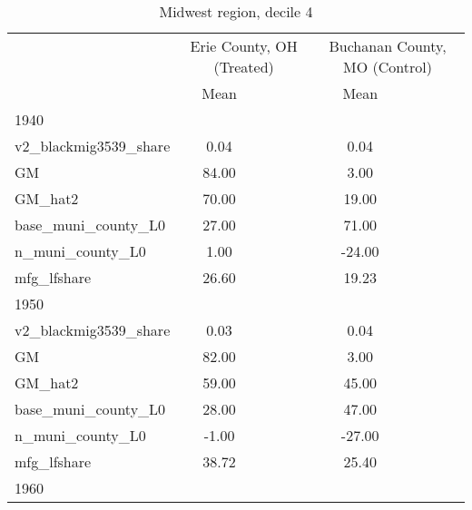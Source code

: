 \begin{table}[htbp]\centering
\def\sym#1{\ifmmode^{#1}\else\(^{#1}\)\fi}
\caption{Midwest region, decile 4 \label{tab1}}
\begin{tabular}{l*{2}{ccc}}
\toprule
                    &\multicolumn{3}{c}{Erie County, OH (Treated)}&\multicolumn{3}{c}{Buchanan County, MO (Control)}\\
                    &        Mean&            &            &        Mean&            &            \\
\midrule
1940                &            &            &            &            &            &            \\
v2\_blackmig3539\_share&        0.04&            &            &        0.04&            &            \\
GM                  &       84.00&            &            &        3.00&            &            \\
GM\_hat2             &       70.00&            &            &       19.00&            &            \\
base\_muni\_county\_L0 &       27.00&            &            &       71.00&            &            \\
n\_muni\_county\_L0    &        1.00&            &            &      -24.00&            &            \\
mfg\_lfshare         &       26.60&            &            &       19.23&            &            \\
\midrule
1950                &            &            &            &            &            &            \\
v2\_blackmig3539\_share&        0.03&            &            &        0.04&            &            \\
GM                  &       82.00&            &            &        3.00&            &            \\
GM\_hat2             &       59.00&            &            &       45.00&            &            \\
base\_muni\_county\_L0 &       28.00&            &            &       47.00&            &            \\
n\_muni\_county\_L0    &       -1.00&            &            &      -27.00&            &            \\
mfg\_lfshare         &       38.72&            &            &       25.40&            &            \\
\midrule
1960                &            &            &            &            &            &            \\

\end{tabular}
\end{table}
